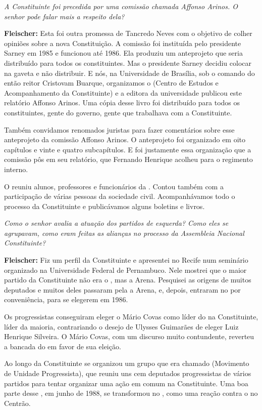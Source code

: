 \emph{A Constituinte foi precedida por uma comissão chamada Affonso
Arinos. O senhor pode falar mais a respeito dela?}

\textbf{Fleischer:} Esta foi outra promessa de Tancredo Neves com o
objetivo de colher opiniões sobre a nova Constituição. A comissão foi
instituída pelo presidente Sarney em 1985 e funcionou até 1986. Ela
produziu um anteprojeto que seria distribuído para todos os
constituintes. Mas o presidente Sarney decidiu colocar na gaveta e não
distribuir. E nós, na Universidade de Brasília, sob o comando do então
reitor Cristovam Buarque, organizamos o  (Centro de Estudos e
Acompanhamento da Constituinte) e a editora da universidade publicou
este relatório Affonso Arinos. Uma cópia desse livro foi distribuído
para todos os constituintes, gente do governo, gente que trabalhava com
a Constituinte.

Também convidamos renomados juristas para fazer comentários sobre esse
anteprojeto da comissão Affonso Arinos. O anteprojeto foi organizado em
oito capítulos e vinte e quatro subcapítulos. E foi justamente essa
organização que a comissão pôs em seu relatório, que Fernando Henrique
acolheu para o regimento interno.

O  reuniu alunos, professores e funcionários da . Contou também
com a participação de várias pessoas da sociedade civil. Acompanhávamos
todo o processo da Constituinte e publicávamos alguns boletins e livros.

\emph{Como o senhor avalia a atuação dos partidos de esquerda? Como
eles se agrupavam, como eram feitas as alianças no processo da
Assembleia Nacional Constituinte?}

\textbf{Fleischer:} Fiz um perfil da Constituinte e apresentei no Recife
num seminário organizado na Universidade Federal de Pernambuco. Nele
mostrei que o maior partido da Constituinte não era o , mas a Arena.
Pesquisei as origens de muitos deputados e muitos deles passaram pela a
Arena,  e, depois, entraram no  por conveniência, para se
elegerem em 1986.

Os progressistas conseguiram eleger o Mário Covas como líder do  na
Constituinte, líder da maioria, contrariando o desejo de Ulysses
Guimarães de eleger Luiz Henrique Silveira. O Mário Covas, com um
discurso muito contundente, reverteu a bancada do  em favor de sua
eleição.

Ao longo da Constituinte se organizou um grupo que era chamado 
(Movimento de Unidade Progressista), que reuniu uns cem deputados
progressistas de vários partidos para tentar organizar uma ação em comum
na Constituinte. Uma boa parte desse , em junho de 1988, se
transformou no , como uma reação contra o  no Centrão.

